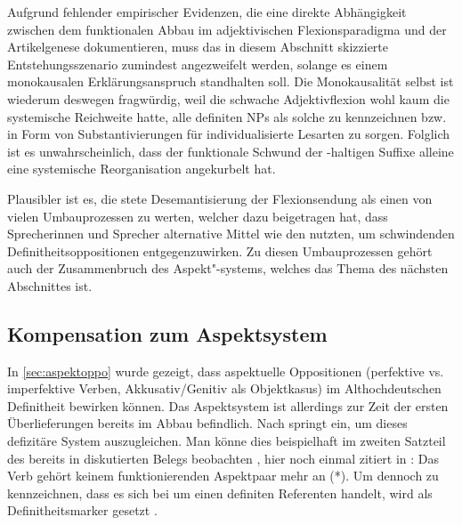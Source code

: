 Aufgrund fehlender empirischer Evidenzen, die eine direkte Abhängigkeit zwischen dem funktionalen Abbau im adjektivischen Flexionsparadigma und der Artikelgenese dokumentieren, muss das in diesem Abschnitt skizzierte Entstehungsszenario  zumindest angezweifelt werden, solange es einem monokausalen Erklärungsanspruch standhalten soll. Die Monokausalität selbst ist wiederum deswegen fragwürdig, weil  die schwache Adjektivflexion wohl kaum die systemische Reichweite hatte,  alle definiten NPs als solche zu kennzeichnen bzw. in Form von Substantivierungen  für individualisierte  Lesarten zu sorgen. Folglich ist es unwahrscheinlich, dass der funktionale Schwund der -haltigen Suffixe  alleine eine systemische Reorganisation angekurbelt hat. 

Plausibler ist es, die stete Desemantisierung der Flexionsendung als einen von vielen Umbauprozessen zu werten, welcher dazu beigetragen hat, dass Sprecherinnen und Sprecher alternative Mittel wie den  nutzten, um schwindenden Definitheitsoppositionen  entgegenzuwirken. Zu diesen Umbauprozessen gehört auch der Zusammenbruch des  Aspekt"-systems, welches das Thema des nächsten Abschnittes ist.

\subsection{Kompensation zum Aspektsystem} \label{aspekt}

In \ref{sec:aspektoppo} wurde gezeigt, dass aspektuelle  Oppositionen (perfektive vs. imperfektive Verben, Akkusativ/Genitiv als Objektkasus)  im Althochdeutschen De\-fi\-nit\-heit bewirken können. Das Aspektsystem  ist allerdings zur Zeit der ersten Überlieferungen bereits im Abbau befindlich. Nach  \textcite{Leiss1994,Leiss2000,Leiss2010} springt  ein, um dieses defizitäre System auszugleichen. Man könne dies beispielhaft im zweiten Satzteil des bereits in  diskutierten Belegs beobachten \parencite[180--181]{Leiss2000}, hier noch einmal zitiert in : Das Verb  gehört keinem funktionierenden Aspektpaar  mehr an (*). Um dennoch zu kennzeichnen, dass es sich bei  um einen definiten Referenten handelt, wird  als Definitheitsmarker  gesetzt \parencite[181]{Leiss2000}.


